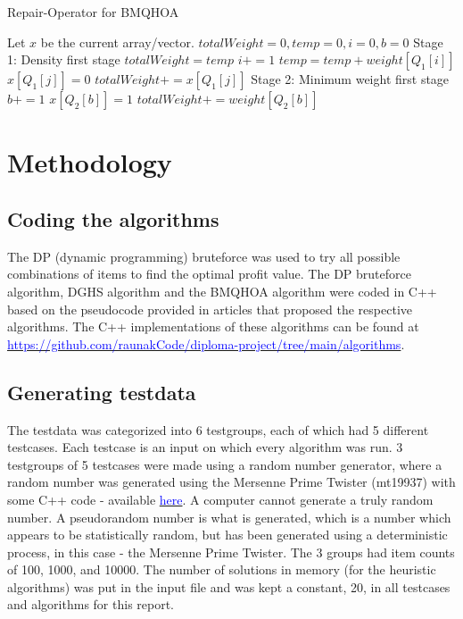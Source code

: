 \documentclass[titlepage]{article}
\begin{document}
\clearpage

\begin{breakablealgorithm}
\caption{Repair-Operator for BMQHOA}\label{harmonicRepair}
    \begin{algorithmic}
        \State Let $x$ be the current array/vector.
        \State $totalWeight = 0, temp = 0, i = 0, b = 0$
        \State Stage 1: Density first stage
            \State $totalWeight = temp$
            \State $i += 1$
            \State $temp = temp + weight[Q_{1}[i]]$
        \EndWhile
            \State $x[Q_{1}[j]] = 0$
            \State $totalWeight += x[Q_{1}[j]]$
        \EndFor
        \State Stage 2: Minimum weight first stage
            \State $b += 1$
                    \State $x[Q_{2}[b]] = 1$
                \State $totalWeight += weight[Q_{2}[b]]$
            \EndIf
        \EndWhile
    \end{algorithmic}
\end{breakablealgorithm}

\newpage

\section{Methodology}

\subsection{Coding the algorithms}
The DP (dynamic programming) bruteforce was used to try all possible combinations of items to find the optimal profit value. The DP bruteforce algorithm, DGHS algorithm and the BMQHOA algorithm were coded in C++ based on the pseudocode provided in articles that proposed the respective algorithms. The C++ implementations of these algorithms can be found at \href{https://github.com/raunakCode/diploma-project/tree/main/algorithms}{\textcolor{blue}{https://github.com/raunakCode/diploma-project/tree/main/algorithms}}. 

\subsection{Generating testdata}
The testdata was categorized into 6 testgroups, each of which had 5 different testcases. Each testcase is an input on which every algorithm was run. 3 testgroups of 5 testcases were made using a random number generator, where a random number was generated using the Mersenne Prime Twister (mt19937) \cite{mersenne} with some C++ code - available \href{https://github.com/raunakCode/diploma-project/blob/main/testing/gen.cpp}{\textcolor{blue}{here}}. A computer cannot generate a truly random number. A pseudorandom number is what is generated, which is a number which appears to be statistically random, but has been generated using a deterministic process, in this case - the Mersenne Prime Twister. The 3 groups had item counts of 100, 1000, and 10000. The number of solutions in memory (for the heuristic algorithms) was put in the input file and was kept a constant, 20, in all testcases and algorithms for this report. 
\end{document}
